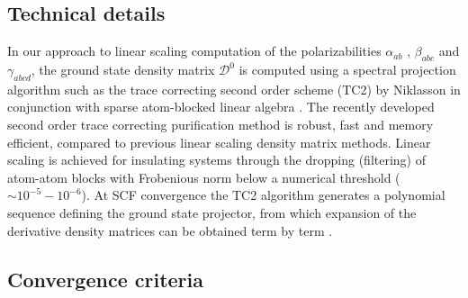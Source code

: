 \documentclass[prl,aps,letterpaper,twocolumn,showpacs,twocolumngrid,superbib]{revtex4}
\begin{document}
\subsection{Technical details}

In our approach to linear scaling computation of the polarizabilities 
$\alpha_{ab}$ \cite{Weber04}, $\beta_{abc}$ and $\gamma_{abcd}$, the ground state
density matrix $\mathcal{D}^0$ is computed using a spectral projection algorithm such
as the trace correcting second order scheme (TC2) by Niklasson \cite{ANiklasson02A} in 
conjunction with sparse atom-blocked linear algebra \cite{ANiklasson03,MChallacombe00B}.
The recently developed second order trace correcting purification method is robust,
fast and memory efficient, compared to previous linear scaling density matrix methods.  
Linear scaling is achieved for insulating systems through the dropping (filtering) of atom-atom 
blocks with Frobenious norm below a numerical threshold ($\sim 10^{-5}-10^{-6}$).
At SCF convergence the TC2 algorithm generates a polynomial sequence 
defining the ground state projector, from which expansion of the derivative 
density matrices can be obtained term by term \cite{ANiklasson04}.

\subsection{Convergence criteria}
\end{document}
